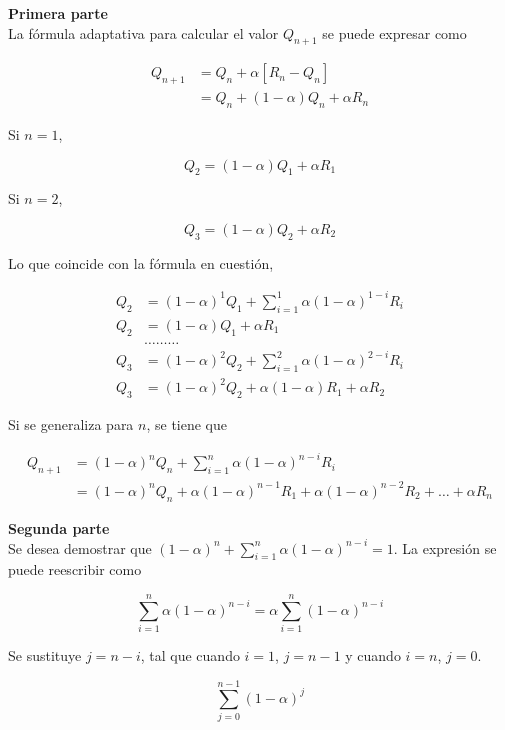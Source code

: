 \documentclass[12pt]{article}
\begin{document}
\begin{itemize}
    \textbf{Primera parte}\\
    La fórmula adaptativa para calcular el valor $Q_{n+1}$ se puede expresar como

    \begin{align*}
        Q_{n+1} &= Q_n+\alpha\left[R_{n}-Q_{n}\right] \\
        &= Q_n + \left(1-\alpha\right)Q_n + \alpha R_n
    \end{align*}

    Si $n=1$,

    \[
        Q_{2} = \left(1-\alpha\right)Q_1 + \alpha R_1
    \]

    Si $n=2$,

    \[
        Q_{3} = \left(1-\alpha\right)Q_2 + \alpha R_2
    \]

    Lo que coincide con la fórmula en cuestión,

    \begin{align*}
        Q_{2} &= (1-\alpha)^{1}Q_{1} + \sum_{i=1}^{1} \alpha(1-\alpha)^{1-i}R_{i} \\
        Q_{2}&= (1-\alpha)Q_{1} + \alpha R_{1} \\
        & \ldots \ldots \ldots \\
        Q_{3} &= (1-\alpha)^{2}Q_{2} + \sum_{i=1}^{2} \alpha(1-\alpha)^{2-i}R_{i} \\
        Q_{3}& = (1-\alpha)^{2}Q_{2} + \alpha(1-\alpha)R_{1} + \alpha R_{2}
    \end{align*}

    Si se generaliza para $n$, se tiene que

    \begin{align*}
        Q_{n+1} &= (1-\alpha)^{n}Q_{n} + \sum_{i=1}^{n} \alpha(1-\alpha)^{n-i}R_{i} \\
        &= (1-\alpha)^{n}Q_{n} + \alpha(1-\alpha)^{n-1}R_{1} + \alpha(1-\alpha)^{n-2}R_{2} + \ldots + \alpha R_{n}
    \end{align*}

    \textbf{Segunda parte}\\
    Se desea demostrar que $(1-\alpha)^{n}+\sum_{i=1}^{n} \alpha(1-\alpha)^{n-i}=1$.
    La expresión se puede reescribir como

    \[
        \sum_{i=1}^{n} \alpha\left( 1 - \alpha \right)^{n-i} = \alpha\sum_{i=1}^{n} \left( 1 - \alpha \right)^{n-i}
    \]

    Se sustituye $j=n-i$, tal que cuando $i=1$, $j=n-1$ y cuando $i=n$, $j=0$.

    \[
        \sum_{j=0}^{n-1} \left( 1-\alpha \right)^{j}
    \]


\end{itemize}
\end{document}
